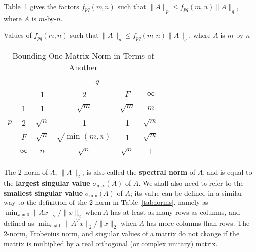 Table~\ref{tableMatrixNormFpq} gives the
factors $f_{pq}(m,n)$ such that $\| A \|_p \leq f_{pq}(m,n) \| A \|_q$, where
$A$ is $m$-by-$n$.

\begin{table}[t]
\caption{Bounding One Matrix Norm in Terms of Another}
\label{tableMatrixNormFpq}

\begin{center}
Values of $f_{pq}(m,n)$ such that $\| A \|_p \leq f_{pq}(m,n) \| A \|_q$, where $A$ is $m$-by-$n$ \\

\begin{tabular}{|cc|c|c|c|c|}
\hline
    &          & \multicolumn{4}{|c|}{$q$} \\
    &          & \multicolumn{1}{|c}{1} & \multicolumn{1}{c}{2} & \multicolumn{1}{c}{$F$}
    & \multicolumn{1}{c|}{$\infty$} \\ \hline
    &     1    & 1          &     $\sqrt{m}$      & $\sqrt{m}$ &    $m$      \\ \cline{3-6}
$p$ &     2    & $\sqrt{n}$ &         1           &       1    & $\sqrt{m}$  \\ \cline{3-6}
    &   $F$    & $\sqrt{n}$ & $\sqrt{\min (m,n)}$ &       1    & $\sqrt{m}$  \\ \cline{3-6}
    & $\infty$ & $n$        &     $\sqrt{n}$      & $\sqrt{n}$ &     1       \\ \hline
\end{tabular}
\end{center}
\end{table}

The 2-norm of $A$, $\|A\|_2$, is also called the {\bf spectral
norm} of $A$, and is equal to the {\bf largest singular value}
$\sigma_{\max}(A)$ of $A$.
We shall also need to refer to the {\bf smallest singular value}
$\sigma_{\min}(A)$ of $A$; its value can be defined in a similar way to
the definition of the 2-norm in Table~\ref{tabnorms}, namely as
$\min_{x \neq 0} \|Ax\|_2 / \|x\|_2$ when $A$
has at least as many rows as columns, and defined as
$\min_{x \neq 0} \|A^Tx\|_2 / \|x\|_2$ when $A$ has more
columns than rows.  The 2-norm,
Frobenius norm,
and singular values of a matrix do not change
if the matrix is multiplied by a real orthogonal (or complex unitary) matrix.

